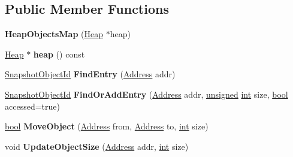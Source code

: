 \subsection*{Public Member Functions}
\begin{DoxyCompactItemize}
\item 
\mbox{\label{classv8_1_1internal_1_1HeapObjectsMap_ae05dd1e9392b3a3389440228746546d2}} 
{\bfseries Heap\+Objects\+Map} (\mbox{\hyperlink{classv8_1_1internal_1_1Heap}{Heap}} $\ast$heap)
\item 
\mbox{\label{classv8_1_1internal_1_1HeapObjectsMap_acdb7cbef595dbc409a453d73efa68ceb}} 
\mbox{\hyperlink{classv8_1_1internal_1_1Heap}{Heap}} $\ast$ {\bfseries heap} () const
\item 
\mbox{\label{classv8_1_1internal_1_1HeapObjectsMap_ab5d737fbbba9b33cd3c853eb7b506cf4}} 
\mbox{\hyperlink{classuint32__t}{Snapshot\+Object\+Id}} {\bfseries Find\+Entry} (\mbox{\hyperlink{classuintptr__t}{Address}} addr)
\item 
\mbox{\label{classv8_1_1internal_1_1HeapObjectsMap_a0782b8e7d38d2d3f8805bf9525b933c6}} 
\mbox{\hyperlink{classuint32__t}{Snapshot\+Object\+Id}} {\bfseries Find\+Or\+Add\+Entry} (\mbox{\hyperlink{classuintptr__t}{Address}} addr, \mbox{\hyperlink{classunsigned}{unsigned}} \mbox{\hyperlink{classint}{int}} size, \mbox{\hyperlink{classbool}{bool}} accessed=true)
\item 
\mbox{\label{classv8_1_1internal_1_1HeapObjectsMap_a4dbb05ebfb10dd823495d0802692a1f5}} 
\mbox{\hyperlink{classbool}{bool}} {\bfseries Move\+Object} (\mbox{\hyperlink{classuintptr__t}{Address}} from, \mbox{\hyperlink{classuintptr__t}{Address}} to, \mbox{\hyperlink{classint}{int}} size)
\item 
\mbox{\label{classv8_1_1internal_1_1HeapObjectsMap_a15a31776da26230e3641837998095544}} 
void {\bfseries Update\+Object\+Size} (\mbox{\hyperlink{classuintptr__t}{Address}} addr, \mbox{\hyperlink{classint}{int}} size)
\item 
\mbox{\label{classv8_1_1internal_1_1HeapObjectsMap_a52b2767a4297aed98cf12972445a3775}} 

\end{DoxyCompactItemize}
